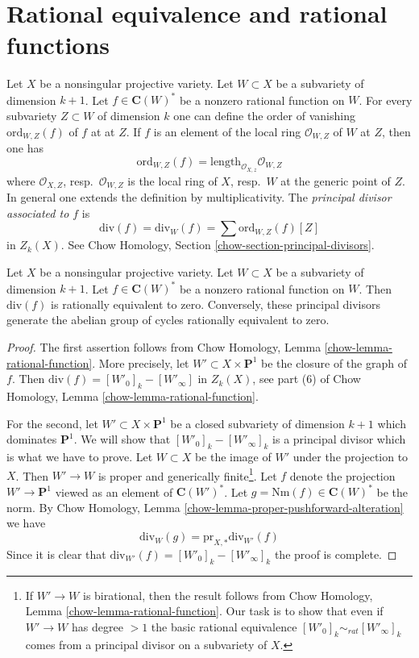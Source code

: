 \section{Rational equivalence and rational functions}
\label{section-alternative}

\noindent
Let $X$ be a nonsingular projective variety. Let $W \subset X$ be a subvariety
of dimension $k + 1$. Let $f \in \mathbf{C}(W)^*$ be a nonzero rational
function on $W$. For every subvariety $Z \subset W$ of dimension $k$
one can define the order of vanishing $\text{ord}_{W, Z}(f)$ of $f$ at
at $Z$. If $f$ is an element of the local ring $\mathcal{O}_{W, Z}$
of $W$ at $Z$, then one has
$$
\text{ord}_{W, Z}(f) = \text{length}_{\mathcal{O}_{X, z}} \mathcal{O}_{W, Z}
$$
where $\mathcal{O}_{X, Z}$, resp.\ $\mathcal{O}_{W, Z}$ is the
local ring of $X$, resp.\ $W$ at the generic point of $Z$. In general one
extends the definition by multiplicativity. The {\it principal divisor
associated to $f$} is
$$
\text{div}(f) = \text{div}_W(f) = \sum \text{ord}_{W, Z}(f)[Z]
$$
in $Z_k(X)$. See Chow Homology, Section \ref{chow-section-principal-divisors}.

\begin{lemma}
\label{lemma-rational-equivalence}
Let $X$ be a nonsingular projective variety. Let $W \subset X$ be a subvariety
of dimension $k + 1$. Let $f \in \mathbf{C}(W)^*$ be a nonzero rational
function on $W$. Then $\text{div}(f)$ is rationally equivalent to zero.
Conversely, these principal divisors generate the abelian group of
cycles rationally equivalent to zero.
\end{lemma}

\begin{proof}
The first assertion follows from
Chow Homology, Lemma \ref{chow-lemma-rational-function}.
More precisely, let $W' \subset X \times \mathbf{P}^1$ be the closure
of the graph of $f$. Then $\text{div}(f) = [W'_0]_k - [W'_\infty]$
in $Z_k(X)$, see part (6) of
Chow Homology, Lemma \ref{chow-lemma-rational-function}.

\medskip\noindent
For the second, let $W' \subset X \times \mathbf{P}^1$ be a closed
subvariety of dimension $k + 1$ which dominates $\mathbf{P}^1$.
We will show that $[W'_0]_k - [W'_\infty]_k$ is a principal divisor
which is what we have to prove. Let $W \subset X$ be the image of $W'$
under the projection to $X$. Then $W' \to W$ is proper and generically
finite\footnote{If $W' \to W$ is birational, then the result follows
from Chow Homology, Lemma \ref{chow-lemma-rational-function}.
Our task is to show that even if $W' \to W$
has degree $>1$ the basic rational equivalence
$[W'_0]_k \sim_{rat} [W'_\infty]_k$ comes from a principal divisor
on a subvariety of $X$.}. Let $f$ denote the projection $W' \to \mathbf{P}^1$
viewed as an element of $\mathbf{C}(W')^*$. Let
$g = \text{Nm}(f) \in \mathbf{C}(W)^*$ be the norm. By
Chow Homology, Lemma \ref{chow-lemma-proper-pushforward-alteration}
we have
$$
\text{div}_W(g) = \text{pr}_{X, *}\text{div}_{W'}(f)
$$
Since it is clear that 
$\text{div}_{W'}(f) = [W'_0]_k - [W'_\infty]_k$ the proof is complete.
\end{proof}


